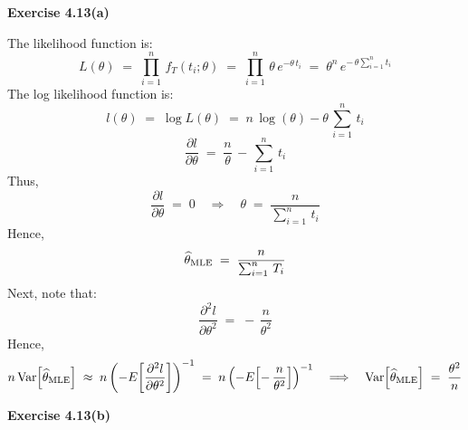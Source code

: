 
\noindent
\textbf{Exercise 4.13(a)}

\vskip 0.3cm
\noindent
The likelihood function is:
\begin{equation*}
L(\theta)
\;=\;\prod_{i=1}^{n}\,f_{T}(t_{i};\theta)
\;=\;\prod_{i=1}^{n}\,\theta\,e^{-\theta\,t_{i}}
\;=\;\theta^{n}\,e^{-\,\theta\sum_{i=1}^{n}t_{i}}
\end{equation*}
The log likelihood function is:
\begin{equation*}
l(\theta)
\;=\; \log L(\theta)
\;=\; n\,\log(\theta) - \theta\,\sum_{i=1}^{n}\,t_{i}
\end{equation*}
\begin{equation*}
\dfrac{\partial l}{\partial\theta}
\;=\; \dfrac{n}{\theta} \, - \, \sum_{i=1}^{n}\,t_{i}
\end{equation*}
Thus,
\begin{equation*}
\dfrac{\partial l}{\partial\theta} \; = \; 0
\quad\Longrightarrow\quad
\theta \; = \; \dfrac{n}{\sum_{i=1}^{n}\,t_{i}}
\end{equation*}
Hence,
\begin{equation*}
\widehat{\theta}_{\textnormal{MLE}} \; = \; \dfrac{n}{\sum_{i=1}^{n}\,T_{i}}
\end{equation*}
Next, note that:
\begin{equation*}
\dfrac{\partial^{2}l}{\partial\theta^{2}}
\;=\; -\,\dfrac{n}{\theta^{2}}
\end{equation*}
Hence,
\begin{equation*}
n\,\textnormal{Var}\!\left[\widehat{\theta}_{\textnormal{MLE}}\right]
\;\approx\; n\left(-E\!\left[\dfrac{\partial^{2}l}{\partial\theta^{2}}\right]\right)^{-1}
\;=\; n\left(-E\!\left[-\,\dfrac{n}{\theta^{2}}\right]\right)^{-1}
\quad\Longrightarrow\quad
\textnormal{Var}\!\left[\widehat{\theta}_{\textnormal{MLE}}\right]
\;=\; \dfrac{\theta^{2}}{n}
\end{equation*}

\vskip 1.0cm
\noindent
\textbf{Exercise 4.13(b)}


